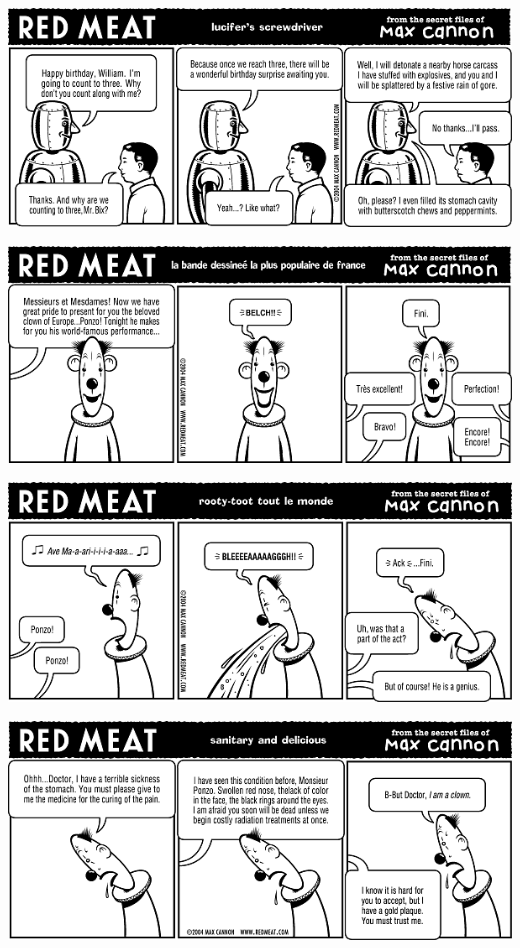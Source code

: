 \documentclass[a4paper,twoside,11pt]{article}
\begin{document}
\includegraphics[width=\textwidth]{redmeat_2004-11-23.png}



\includegraphics[width=\textwidth]{redmeat_2004-11-30.png}



\includegraphics[width=\textwidth]{redmeat_2004-12-07.png}



\includegraphics[width=\textwidth]{redmeat_2004-12-14.png}
\end{document}
